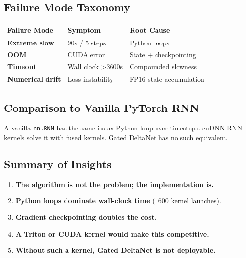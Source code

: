 \subsection{Failure Mode Taxonomy}

\begin{table}[H]
\centering
\small
\begin{tabular}{lll}
\toprule
\textbf{Failure Mode} & \textbf{Symptom} & \textbf{Root Cause} \\
\midrule
\textbf{Extreme slow} & 90s / 5 steps & Python loops \\
\textbf{OOM} & CUDA error & State + checkpointing \\
\textbf{Timeout} & Wall clock >3600s & Compounded slowness \\
\textbf{Numerical drift} & Loss instability & FP16 state accumulation \\
\bottomrule
\end{tabular}
\end{table}

\subsection{Comparison to Vanilla PyTorch RNN}

A vanilla \texttt{nn.RNN} has the same issue: Python loop over timesteps. cuDNN 
RNN kernels solve it with fused kernels. Gated DeltaNet has no such 
equivalent.

\subsection{Summary of Insights}

\begin{enumerate}
\item \textbf{The algorithm is not the problem; the implementation is.}
\item \textbf{Python loops dominate wall-clock time} (~600 kernel launches).
\item \textbf{Gradient checkpointing doubles the cost.}
\item \textbf{A Triton or CUDA kernel would make this competitive.}
\item \textbf{Without such a kernel, Gated DeltaNet is not deployable.}

\end{enumerate}
